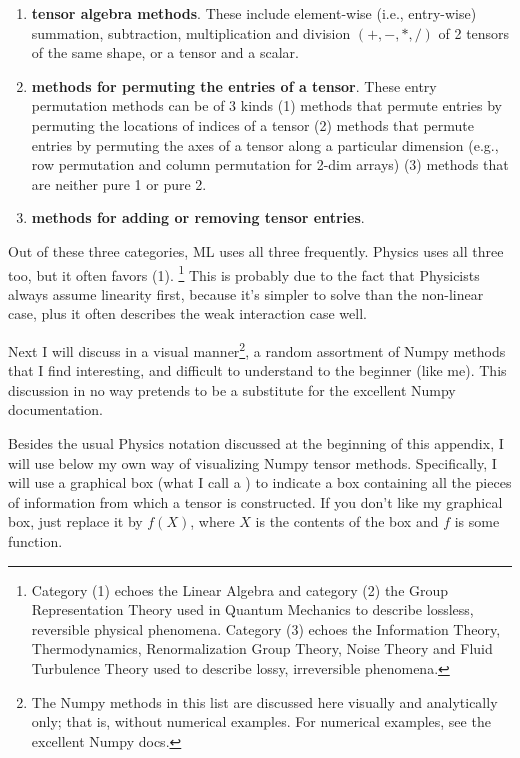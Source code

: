 \begin{enumerate}

\item {\bf tensor algebra methods}. These include
element-wise (i.e., entry-wise) summation, subtraction, multiplication and
division $(+,-,*,/)$ of 2 tensors of the same shape, or a tensor and a scalar.

\item
{\bf methods 
for permuting  the entries of a tensor}. These
 entry permutation methods
 can be of 3 kinds
 (1) methods that
 permute entries by permuting the  locations of indices of a tensor 
 (2) methods  that 
 permute entries by permuting the  axes
 of a tensor along
 a particular dimension
 (e.g., row permutation and column permutation for 2-dim arrays)
(3) methods that
are neither pure 1 or pure 2.

\item {\bf methods for adding or
removing tensor entries}.
\end{enumerate}
Out of these three categories, ML uses all three frequently.  Physics uses all three too, but it often favors (1). \footnote{
Category (1) echoes the Linear Algebra and category (2) the Group Representation Theory used in Quantum Mechanics to describe lossless, reversible physical phenomena. Category (3) echoes the Information Theory, Thermodynamics, Renormalization Group Theory, Noise Theory and Fluid Turbulence Theory used to describe lossy, irreversible phenomena.} This is
probably due to the fact
that Physicists always assume linearity  first, because it's  simpler to solve than the non-linear case, plus it often describes the weak interaction case well.

Next I will discuss in a visual manner\footnote{The Numpy methods in this list are discussed here visually and analytically only; that is, without numerical examples. For numerical examples, see the excellent Numpy docs.}, a random
assortment of Numpy 
methods that I find interesting, and difficult to understand to the beginner (like me). This discussion in no way pretends to be
a substitute for the excellent Numpy documentation.
 
Besides the usual Physics notation
discussed at the beginning of this appendix, I will 
use below my own way of visualizing Numpy tensor methods. Specifically, I will 
use a graphical box (what I call a ) to indicate
a box containing all the pieces of information
from which a tensor is constructed.
If you don't like my graphical box,
just replace it by $f(X)$,
where $X$ is the contents of the box and
$f$ is some function.

